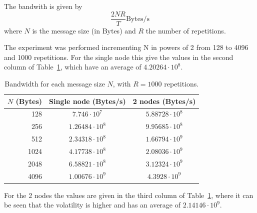 The bandwith is given by
$$\frac{2N R}{T} \text{Bytes/s}$$
where $N$ is the message size (in Bytes) and $R$ the number of repetitions.

The experiment was performed incrementing N in powers of 2 from 128 to 4096 and 1000 repetitions.
For the single node this give the values in the second column of Table~\ref{tab:bandwidth},
which have an average of $4.20264 \cdot 10^{8}$.

\begin{table}[htbp]
  \centering
  \caption{Bandwidth for each message size $N$, with $R = 1000$ repetitions.}
  \label{tab:bandwidth}
  \begin{tabular}{rcc}
    \toprule
    $N$ (Bytes) & Single node (Bytes/s) & 2 nodes (Bytes/s) \\
    \midrule
    128  & $7.746   \cdot 10^{7}$ & $5.88728 \cdot 10^{8}$ \\
    256  & $1.26484 \cdot 10^{8}$ & $9.95685 \cdot 10^{8}$ \\
    512  & $2.34318 \cdot 10^{8}$ & $1.66794 \cdot 10^{9}$ \\
    1024 & $4.17738 \cdot 10^{8}$ & $2.08036 \cdot 10^{9}$ \\
    2048 & $6.58821 \cdot 10^{8}$ & $3.12324 \cdot 10^{9}$ \\
    4096 & $1.00676 \cdot 10^{9}$ & $4.3928  \cdot 10^{9}$ \\
    \bottomrule
  \end{tabular}
\end{table}

For the 2 nodes the values are given in the third column of Table~\ref{tab:bandwidth},
where it can be seen that the volatility is higher and has an average of $2.14146 \cdot 10^{9}$.
